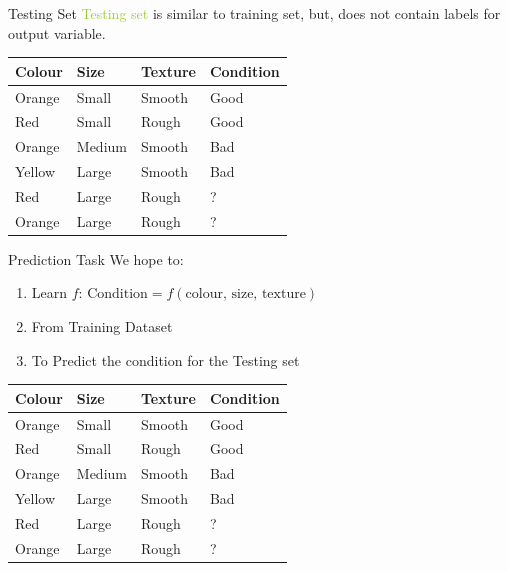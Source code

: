 \documentclass[usenames,dvipsnames]{beamer}
\begin{document}
\begin{frame}{Testing Set}
\textcolor{YellowGreen}{Testing set} is similar to \textcolor{Peach}{training set}, but, does not contain labels for output variable. 

\begin{table}[]
	\begin{tabular}{|l|l|l||l|}
		\hline 
		\textbf{Colour} & \textbf{Size} & \textbf{Texture} & \textbf{Condition} \\ \hline 
		\rowcolor{Peach}
		Orange & Small & Smooth  & Good      \\
		\rowcolor{Peach}
		Red    & Small  & Rough  & Good \\
		\rowcolor{Peach}
		Orange & Medium & Smooth & Bad \\
		\rowcolor{Peach}
		Yellow & Large  & Smooth & Bad \\ \hline
				\rowcolor{YellowGreen}
		Red    & Large  & Rough  & ? \\
		\rowcolor{YellowGreen}
		Orange &  Large & Rough  & ? \\ \hline          
	\end{tabular}
\end{table}
\end{frame}



\begin{frame}{Prediction Task}
We hope to:
\begin{enumerate}
	\item \pause Learn $f$: 		$\text{Condition} = f(\text{colour, size, texture})$
	\item \pause From Training Dataset
	\item \pause To Predict the condition for the Testing set
\end{enumerate}


\begin{table}[]
	\begin{tabular}{|l|l|l||l|}
		\hline 
		
		\textbf{Colour} & \textbf{Size} & \textbf{Texture} & \textbf{Condition} \\ \hline 
		Orange & Small & Smooth  & Good      \\
		Red    & Small  & Rough  & Good \\
		Orange & Medium & Smooth & Bad \\
		Yellow & Large  & Smooth & Bad \\ \hline
		Red    & Large  & Rough  & ? \\
		Orange &  Large & Rough  & ? \\ \hline          
	\end{tabular}
\end{table}
\end{frame}
\end{document}
